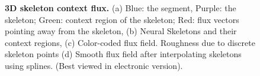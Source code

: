 \begin{figure}[htpb]
\begin{subfigure}[c]{0.16\textwidth}
		\caption{\label{fig::context_field_directions_d}}
	\end{subfigure}
	\hfill\null
	\caption{{\bf 3D skeleton context flux.} (a) Blue: the segment, Purple: the skeleton; Green: context region of the skeleton; Red: flux vectors pointing away from the skeleton, (b) Neural Skeletons and their context regions, (c) Color-coded flux field. Roughness due to discrete skeleton points (d) Smooth flux field after interpolating skeletons using splines. (Best viewed in electronic version).}
	\label{fig:context_field_directions}
\end{figure}
	
